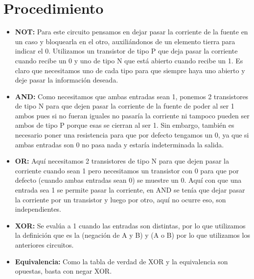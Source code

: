 \documentclass[answers]{exam}
\begin{document}
\section{Procedimiento}
\begin{questions}
  \begin{solution}
    \begin{itemize}
      \item \textbf{NOT:} Para este circuito pensamos en dejar pasar la
            corriente de la fuente en un caso y bloquearla en el otro,
            auxiliándonos de un elemento tierra para indicar el 0. Utilizamos un
            transistor de tipo P que deja pasar la corriente cuando recibe un 0
            y uno de tipo N que está abierto cuando recibe un 1. Es claro que
            necesitamos uno de cada tipo para que siempre haya uno abierto y
            deje pasar la información deseada.
      \item \textbf{AND:} Como necesitamos que ambas entradas sean 1, ponemos 2
            transistores de tipo N para que dejen pasar la corriente de la
            fuente de poder al ser 1 ambos pues si no fueran iguales no pasaría
            la corriente ni tampoco pueden ser ambos de tipo P porque esas se
            cierran al ser 1. Sin embargo, también es necesario poner una
            resistencia para que por defecto tengamos un 0, ya que si ambas
            entradas son 0 no pasa nada y estaría indeterminada la salida.
      \item \textbf{OR:} Aquí necesitamos 2 transistores de tipo N para que
            dejen pasar la corriente cuando sean 1 pero necesitamos un
            transistor con 0 para que por defecto (cuando ambas entradas sean 0)
            se muestre un 0. Aquí con que una entrada sea 1 se permite pasar la
            corriente, en AND se tenía que dejar pasar la corriente por un
            transistor y luego por otro, aquí no ocurre eso, son independientes.
      \item \textbf{XOR:} Se evalúa a 1 cuando las entradas son distintas, por
            lo que utilizamos la definición que es la (negación de A y B) y (A o
            B) por lo que utilizamos los anteriores circuitos.
      \item \textbf{Equivalencia:} Como la tabla de verdad de XOR y la
            equivalencia son opuestas, basta con negar XOR.\@
    \end{itemize}
  \end{solution}


\end{questions}
\end{document}
